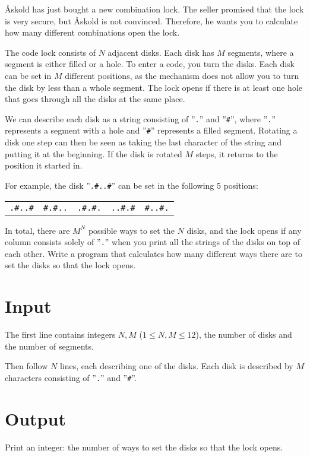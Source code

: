 
Åskold has just bought a new combination lock.
The seller promised that the lock is very secure, but Åskold is not convinced.
Therefore, he wants you to calculate how many different combinations open the lock.

The code lock consists of $N$ adjacent disks.
Each disk has $M$ segments, where a segment is either filled or a hole.
To enter a code, you turn the disks.
Each disk can be set in $M$ different positions, as the mechanism does not allow you to turn the disk by less than a whole segment.
The lock opens if there is at least one hole that goes through all the disks at the same place.

We can describe each disk as a string consisting of ”\texttt{.}” and ”\texttt{\#}”,
where ”\texttt{.}” represents a segment with a hole and ”\texttt{\#}” represents a filled segment.
Rotating a disk one step can then be seen as taking the last character of the string and putting it at the beginning.
If the disk is rotated $M$ steps, it returns to the position it started in.

For example, the disk ”\texttt{.\#..\#}” can be set in the following 5 positions:


\begin{center}
  \begin{tabular}{c|c|c|c|c}
	{\centering \texttt{.\#..\#}} &
	{\centering \texttt{\#.\#..}} &
	{\centering \texttt{.\#.\#.}} &
	{\centering \texttt{..\#.\#}} &
	{\centering \texttt{\#..\#.}}
  \end{tabular}
\end{center}

In total, there are $M^N$ possible ways to set the $N$ disks, and the lock opens if any column consists solely
of ”\texttt{.}” when you print all the strings of the disks on top of each other. Write a program that
calculates how many different ways there are to set the disks so that the lock opens.

\section*{Input}
The first line contains integers $N, M$ ($1 \leq N, M \leq 12$), the number of disks and the number of segments.

Then follow $N$ lines, each describing one of the disks.
Each disk is described by $M$ characters consisting of ”\texttt{.}” and ”\texttt{\#}”.

\section*{Output}
Print an integer: the number of ways to set the disks so that the lock opens.

